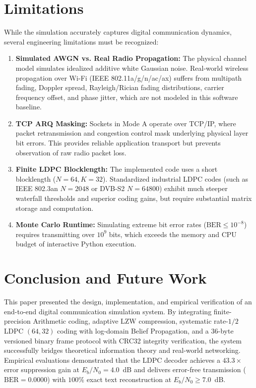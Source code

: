 \documentclass[conference]{IEEEtran}
\begin{document}
\section{Limitations}
While the simulation accurately captures digital communication dynamics, several engineering limitations must be recognized:
\begin{enumerate}
    \item \textbf{Simulated AWGN vs. Real Radio Propagation:} The physical channel model simulates idealized additive white Gaussian noise. Real-world wireless propagation over Wi-Fi (IEEE 802.11a/g/n/ac/ax) suffers from multipath fading, Doppler spread, Rayleigh/Rician fading distributions, carrier frequency offset, and phase jitter, which are not modeled in this software baseline.
    \item \textbf{TCP ARQ Masking:} Sockets in Mode A operate over TCP/IP, where packet retransmission and congestion control mask underlying physical layer bit errors. This provides reliable application transport but prevents observation of raw radio packet loss.
    \item \textbf{Finite LDPC Blocklength:} The implemented code uses a short blocklength ($N=64, K=32$). Standardized industrial LDPC codes (such as IEEE 802.3an $N=2048$ or DVB-S2 $N=64800$) exhibit much steeper waterfall thresholds and superior coding gains, but require substantial matrix storage and computation.
    \item \textbf{Monte Carlo Runtime:} Simulating extreme bit error rates ($\text{BER} \le 10^{-8}$) requires transmitting over $10^9$ bits, which exceeds the memory and CPU budget of interactive Python execution.
\end{enumerate}

\section{Conclusion and Future Work}
This paper presented the design, implementation, and empirical verification of an end-to-end digital communication simulation system. By integrating finite-precision Arithmetic coding, adaptive LZW compression, systematic rate-$1/2$ LDPC $(64, 32)$ coding with log-domain Belief Propagation, and a 36-byte versioned binary frame protocol with CRC32 integrity verification, the system successfully bridges theoretical information theory and real-world networking. Empirical evaluations demonstrated that the LDPC decoder achieves a $43.3\times$ error suppression gain at $E_b/N_0 = 4.0$~dB and delivers error-free transmission ($\text{BER} = 0.0000$) with $100\%$ exact text reconstruction at $E_b/N_0 \ge 7.0$~dB.
\end{document}
